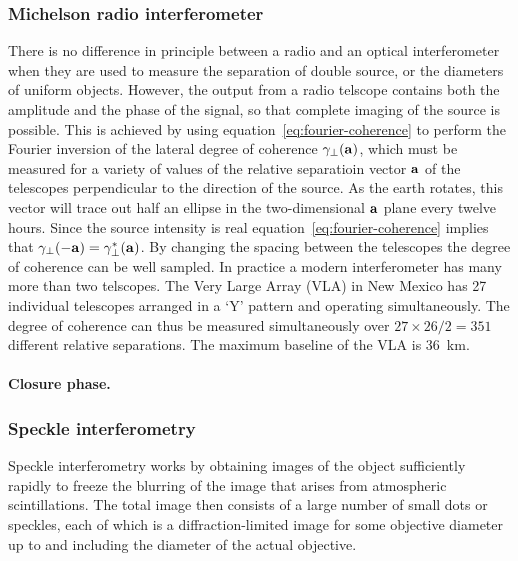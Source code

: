 \documentclass{article}
\begin{document}
\subsubsection{Michelson radio interferometer}

There is no difference in principle between a radio and an optical interferometer when they are used to measure the separation of double source, or the diameters of uniform objects. However, the output from a radio telscope contains both the amplitude and the phase of the signal, so that complete imaging of the source is possible. This is achieved by using equation~\ref{eq:fourier-coherence} to perform the Fourier inversion of the lateral degree of coherence $\gamma_\perp({\bf a})$, which must be measured for a 
variety of values of the relative separatioin vector ${\bf a}$ of the telescopes perpendicular to the direction of the source. As the earth rotates, this vector will trace out half an ellipse in the two-dimensional ${\bf a}$ plane every twelve hours. Since the source intensity is real equation~\ref{eq:fourier-coherence} implies that $\gamma_\perp(-{\bf a})=\gamma_\perp^*({\bf a})$. By changing the spacing between the telescopes the degree of coherence can be well sampled. In practice a modern interferometer has many more than two telscopes. The Very Large Array (VLA) in New Mexico has 27 individual telescopes arranged in a `Y' pattern and operating simultaneously. The degree of coherence can thus be measured simultaneously over 
${27\times 26/2}=351$ different relative separations. The maximum baseline of the VLA is 36~km.

\paragraph{Closure phase.}

\subsubsection{Speckle interferometry}

Speckle interferometry works by obtaining images of the object sufficiently rapidly to freeze the blurring of the image that arises from atmospheric scintillations. The total image then consists of a large number of small dots or speckles, each of which is a diffraction-limited image for some objective diameter up to and including the diameter of the actual objective.
\end{document}

